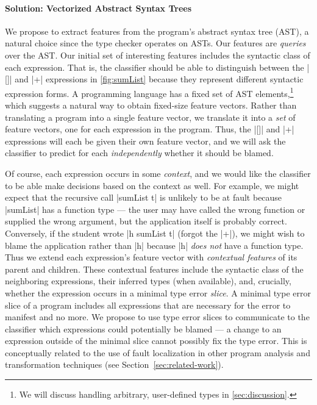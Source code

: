 \paragraph{\textbf{Solution: Vectorized Abstract Syntax Trees}}
We propose to extract features from the program's
abstract syntax tree (AST), a natural choice since the type checker
operates on ASTs.
%
Our features are \emph{queries} over the AST. Our initial set of
interesting features includes the syntactic class of each expression.
%
That is, the classifier should be able to distinguish between the |[]|
and |+| expressions in \autoref{fig:sumList} because they represent
different syntactic expression forms.
%
A programming language has a fixed set of AST elements,\footnote{We will
  discuss handling arbitrary, user-defined types in
  \autoref{sec:discussion}.} which suggests a natural way to obtain
fixed-size feature vectors. Rather than translating a program into a
single feature vector, we translate it into a \emph{set} of feature
vectors, one for each expression in the program.
%
Thus, the |[]| and |+| expressions will each be given their own feature
vector, and we will ask the classifier to predict for each
\emph{independently} whether it should be blamed.

Of course, each expression occurs in some \emph{context}, and we would
like the classifier to be able make decisions based on the context as
well.
%
For example, we might expect that the recursive call |sumList t| is
unlikely to be at fault because |sumList| has a function type --- the
user may have called the wrong function or supplied the wrong argument,
but the application itself is probably correct.
%
Conversely, if the student wrote |h sumList t| (\ie forgot the |+|), we
might wish to blame the application rather than |h| because |h|
\emph{does not} have a function type.
%
Thus we extend each expression's feature vector with
\emph{contextual features} of its parent and children.
%
These contextual features include the syntactic class of the neighboring
expressions, their inferred types (when available), and, crucially, whether
the expression occurs in a minimal type error \emph{slice}.
%
A minimal type error slice of a program includes all expressions that
are necessary for the error to manifest and no more. We propose to
use type error slices to communicate to the classifier which expressions
could potentially be blamed --- a change to an expression outside of the
minimal slice cannot possibly fix the type error. This is conceptually
related to the use of fault localization in other program analysis
and transformation techniques (see Section~\ref{sec:related-work}).

